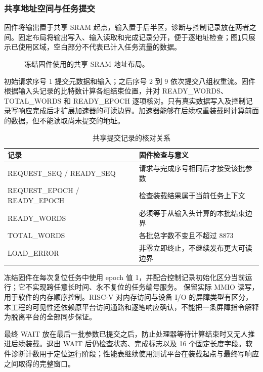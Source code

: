 \subsubsection{共享地址空间与任务提交}
固件将输出置于共享 SRAM 起点，输入置于后半区，诊断与控制记录放在两者之间。固定布局将输出写入、输入读取和完成记录分开，便于逐地址检查；图\ref{fig:address-map}只展示已使用区域，空白部分不代表已计入任务流量的数据。

\begin{figure}[H]\centering
{}
\caption{冻结固件使用的共享 SRAM 地址布局。}\label{fig:address-map}
\end{figure}

初始请求序号 1 提交元数据和输入；之后序号 2 到 9 依次提交八组权重流。固件根据输入头记录的比特数计算各组结束位置，并对 READY\_WORDS、TOTAL\_WORDS 和 READY\_EPOCH 逐项核对。只有真实数据写入及控制记录写响应完成后才扩展加速器的可读边界。加速器能够在后续权重装载时计算前面的数据，但不能读取尚未提交的地址。

\begin{table}[H]\centering\small
\caption{共享提交记录的核对关系}
\begin{tabularx}{\linewidth}{p{39mm}Y}\toprule
记录 & 固件检查与意义\\\midrule
REQUEST\_SEQ / READY\_SEQ & 请求与完成序号相同后才接受该批参数\\
REQUEST\_EPOCH / READY\_EPOCH & 检查装载结果属于当前任务上下文\\
READY\_WORDS & 必须等于从输入头计算的本批结束边界\\
TOTAL\_WORDS & 各批总字数不变且不超过 8873\\
LOAD\_ERROR & 非零立即终止，不继续发布更大可读边界\\\bottomrule
\end{tabularx}
\end{table}

冻结固件在每次复位任务中使用 epoch 值 1，并配合控制记录初始化区分当前运行；它不实现跨任意长时间、永不复位的任务编号服务。 保留实际 MMIO 读写， 用于软件的内存顺序控制。RISC-V 对内存访问与设备 I/O 的屏障类型有区分\cite{riscv}，本工程的可见性还依赖原平台访问通路和逐笔响应确认，不能把一条屏障指令解释为脱离平台的全部同步保证。

最终 WAIT 放在最后一批参数已提交之后，防止处理器等待计算结束时又无人推进后续装载。退出 WAIT 后仍检查状态、完成标志以及 16 个固定长度字段。软件诊断计数用于定位运行阶段；性能表继续使用测试平台在装载起点与最终写响应之间取得的完整窗口。
